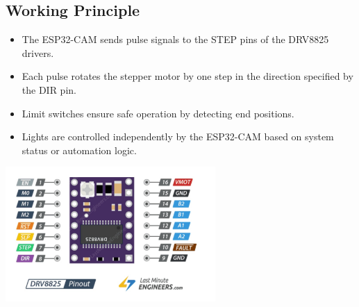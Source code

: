 \documentclass[../weekly]{subfiles}
\begin{document}
\subsection{Working Principle}
\begin{itemize}
    \item The ESP32-CAM sends pulse signals to the STEP pins of the DRV8825 drivers.
    \item Each pulse rotates the stepper motor by one step in the direction specified by the DIR pin.
    \item Limit switches ensure safe operation by detecting end positions.
    \item Lights are controlled independently by the ESP32-CAM based on system status or automation logic.
\end{itemize}

\begin{center}
    \includegraphics[width=0.6\textwidth]{ss1.jpg}
\end{center}
\end{document}
